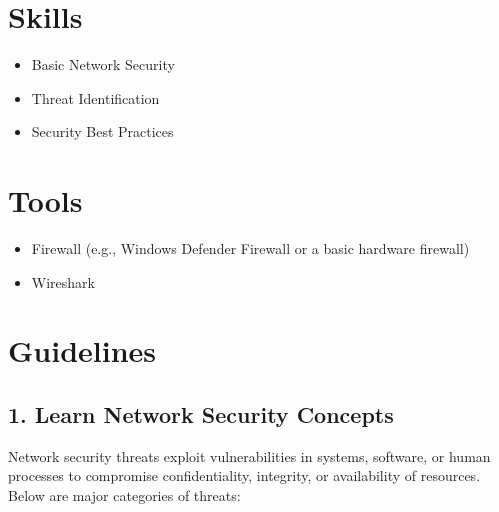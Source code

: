 \documentclass[12pt,a4paper]{report}
\begin{document}
\section{Skills}
\begin{itemize}
  \item Basic Network Security
  \item Threat Identification
  \item Security Best Practices
\end{itemize}

\section{Tools}
\begin{itemize}
  \item Firewall (e.g., Windows Defender Firewall or a basic hardware firewall)
  \item Wireshark
\end{itemize}

\section{Guidelines}
 \newpage
\subsection{1. Learn Network Security Concepts}


Network security threats exploit vulnerabilities in systems, software, or human processes to compromise confidentiality, integrity, or availability of resources. Below are major categories of threats:
\end{document}
